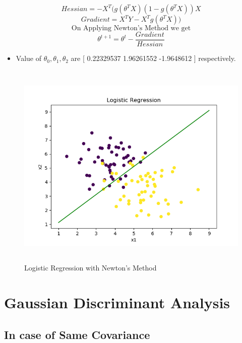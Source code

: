 \documentclass[10pt]{article}
\begin{document}
\[Hessian = -X^T(g(\theta^TX)(1 - g(\theta^TX))X\]
\[Gradient = X^TY - X^Tg(\theta^TX))\]
\[\text{On Applying Newton's Method we get}\]
\[\theta^{t+1} = \theta^t - \frac{Gradient}{Hessian}\]

\begin{itemize}
\item Value of $\theta_0, \theta_1, \theta_2$ are [ 0.22329537  1.96261552 -1.9648612 ] respectively.
\end{itemize}

\begin{figure}[H]
	\includegraphics[width = 15cm,height = 10cm]{Q3_b}
	\caption{Logistic Regression with Newton's Method}
\end{figure}


\section{Gaussian Discriminant Analysis}

\subsection{In case of Same Covariance}
\end{document}

